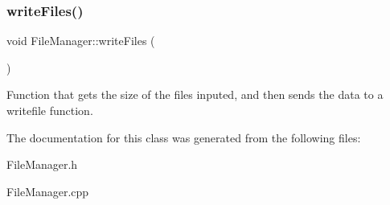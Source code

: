 \subsubsection{\texorpdfstring{write\+Files()}{writeFiles()}}
{\footnotesize\ttfamily void File\+Manager\+::write\+Files (\begin{DoxyParamCaption}{ }\end{DoxyParamCaption})}

Function that gets the size of the files inputed, and then sends the data to a writefile function. 

The documentation for this class was generated from the following files\+:\begin{DoxyCompactItemize}
\item 
File\+Manager.\+h\item 
File\+Manager.\+cpp\end{DoxyCompactItemize}

